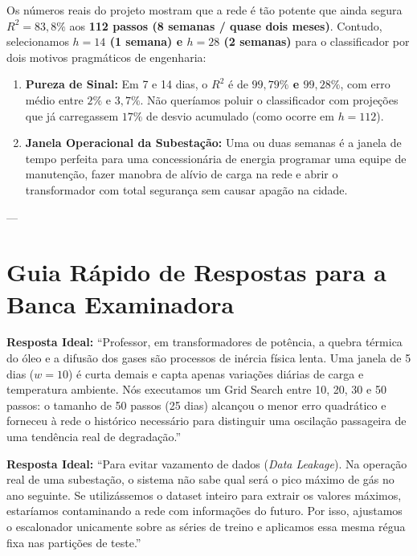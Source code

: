 \documentclass[10pt,a4paper]{article}
\begin{document}
\begin{decisaobox}[Por que escolhemos $h=14$ e $h=28$ para o XGBoost em vez de $h=112$?]
Os números reais do projeto mostram que a rede é tão potente que ainda segura $R^2 = 83,8\%$ aos \textbf{112 passos (8 semanas / quase dois meses)}.
Contudo, selecionamos \textbf{$h=14$ (1 semana) e $h=28$ (2 semanas)} para o classificador por dois motivos pragmáticos de engenharia:
\begin{enumerate}[leftmargin=*,itemsep=1pt]
  \item \textbf{Pureza de Sinal:} Em 7 e 14 dias, o $R^2$ é de \textbf{$99,79\%$ e $99,28\%$}, com erro médio entre $2\%$ e $3,7\%$. Não queríamos poluir o classificador com projeções que já carregassem $17\%$ de desvio acumulado (como ocorre em $h=112$).
  \item \textbf{Janela Operacional da Subestação:} Uma ou duas semanas é a janela de tempo perfeita para uma concessionária de energia programar uma equipe de manutenção, fazer manobra de alívio de carga na rede e abrir o transformador com total segurança sem causar apagão na cidade.
\end{enumerate}
\end{decisaobox}

---

\section{Guia Rápido de Respostas para a Banca Examinadora}

\begin{bancabox}[Pergunta 1: ``Por que fixar w=50 e não uma janela menor de 5 dias?'']
\textbf{Resposta Ideal:} ``Professor, em transformadores de potência, a quebra térmica do óleo e a difusão dos gases são processos de inércia física lenta. Uma janela de 5 dias ($w=10$) é curta demais e capta apenas variações diárias de carga e temperatura ambiente. Nós executamos um Grid Search entre 10, 20, 30 e 50 passos: o tamanho de 50 passos (25 dias) alcançou o menor erro quadrático e forneceu à rede o histórico necessário para distinguir uma oscilação passageira de uma tendência real de degradação.''
\end{bancabox}

\begin{bancabox}
\textbf{Resposta Ideal:} ``Para evitar vazamento de dados (\textit{Data Leakage}). Na operação real de uma subestação, o sistema não sabe qual será o pico máximo de gás no ano seguinte. Se utilizássemos o dataset inteiro para extrair os valores máximos, estaríamos contaminando a rede com informações do futuro. Por isso, ajustamos o escalonador unicamente sobre as séries de treino e aplicamos essa mesma régua fixa nas partições de teste.''
\end{bancabox}
\end{document}
